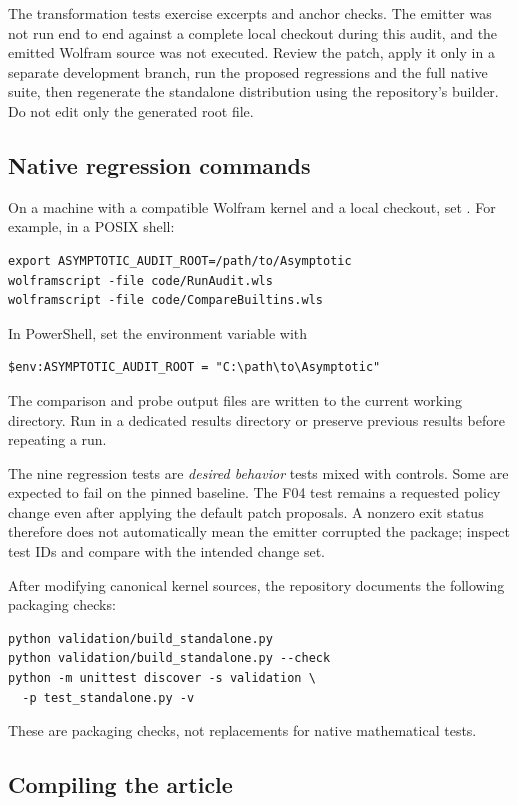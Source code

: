 The transformation tests exercise excerpts and anchor checks. The emitter was not run end to end against a complete local checkout during this audit, and the emitted Wolfram source was not executed. Review the patch, apply it only in a separate development branch, run the proposed regressions and the full native suite, then regenerate the standalone distribution using the repository's builder. Do not edit only the generated root file.

\subsection{Native regression commands}

On a machine with a compatible Wolfram kernel and a local checkout, set . For example, in a POSIX shell:
\begin{lstlisting}
export ASYMPTOTIC_AUDIT_ROOT=/path/to/Asymptotic
wolframscript -file code/RunAudit.wls
wolframscript -file code/CompareBuiltins.wls
\end{lstlisting}
In PowerShell, set the environment variable with
\begin{lstlisting}
$env:ASYMPTOTIC_AUDIT_ROOT = "C:\path\to\Asymptotic"
\end{lstlisting}
The comparison and probe output files are written to the current working directory. Run in a dedicated results directory or preserve previous results before repeating a run.

The nine regression tests are \emph{desired behavior} tests mixed with controls. Some are expected to fail on the pinned baseline. The F04 test remains a requested policy change even after applying the default patch proposals. A nonzero exit status therefore does not automatically mean the emitter corrupted the package; inspect test IDs and compare with the intended change set.

After modifying canonical kernel sources, the repository documents the following packaging checks:
\begin{lstlisting}
python validation/build_standalone.py
python validation/build_standalone.py --check
python -m unittest discover -s validation \
  -p test_standalone.py -v
\end{lstlisting}
These are packaging checks, not replacements for native mathematical tests.\cite{development,ci}

\subsection{Compiling the article}

